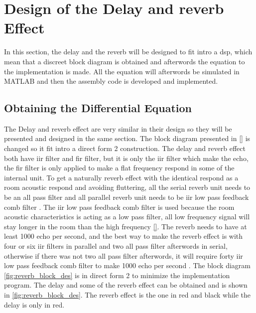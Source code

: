 \section{Design of the Delay and \gls{reverb} Effect}
In this section, the delay and the \gls{reverb} will be designed to fit intro a \gls{dsp}, which mean that a discreet block diagram is obtained and afterwords the equation to the implementation is made. All the equation will afterwords be simulated in MATLAB and then the assembly code is developed and implemented. 


\subsection{Obtaining the Differential Equation}
The Delay and \gls{reverb} effect are very similar in their design so they will be presented and designed in the same section. The block diagram presented in \autoref{} is changed so it fit intro a direct form 2 construction. The delay and \gls{reverb} effect both have \gls{iir} filter and \gls{fir} filter, but it is only the \gls{iir} filter which make the echo, the \gls{fir} filter is only applied to make a flat frequency respond in some of the internal unit. To get a naturally \gls{reverb} effect with the identical respond as a room acoustic respond and avoiding fluttering, all the serial \gls{reverb} unit needs to be an all pass filter and all parallel \gls{reverb} unit needs to be \gls{iir} low pass feedback comb filter \citep{LPCF}. The \gls{iir} low pass feedback comb filter is used because the room acoustic characteristics is acting as a low pass filter, all low frequency signal will stay longer in the room than the high frequency \autoref{}.  The \gls{reverb} needs to have at least 1000 echo per second, and the best way to make the \gls{reverb} effect is with four or six \gls{iir} filters in parallel and two all pass filter afterwords in serial, otherwise if there was not two all pass filter afterwords, it will require forty \gls{iir} low pass feedback comb filter to make 1000 echo per second \citep{natural_sounding_revorb}. The block diagram \autoref{fig:reverb_block_des} is in direct form 2 to minimize the implementation program. The delay and some of the \gls{reverb} effect can be obtained and is shown in \autoref{fig:reverb_block_des}. The \gls{reverb} effect is the one in red and black while the delay is only in red. 

\newpage

